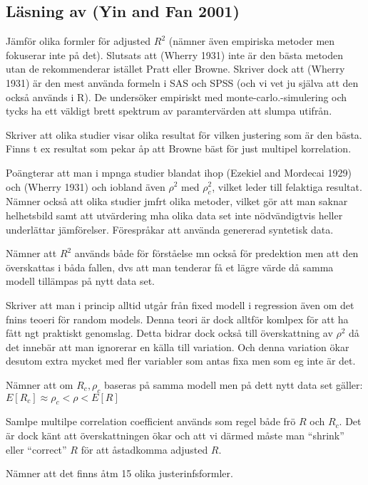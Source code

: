 \documentclass[]{article}
\begin{document}
\subsection{Läsning av (Yin and Fan 2001)}\label{lasning-av-yin2001}

Jämför olika formler för adjusted \(R^2\) (nämner även empiriska metoder
men fokuserar inte på det). Slutsats att (Wherry 1931) inte är den bästa
metoden utan de rekommenderar istället Pratt eller Browne. Skriver dock
att (Wherry 1931) är den mest använda formeln i SAS och SPSS (och vi vet
ju själva att den också används i R). De undersöker empiriskt med
monte-carlo.-simulering och tycks ha ett väldigt brett spektrum av
paramtervärden att slumpa utifrån.

Skriver att olika studier visar olika resultat för vilken justering som
är den bästa. Finns t ex resultat som pekar åp att Browne bäst för just
multipel korrelation.

Poängterar att man i mpnga studier blandat ihop (Ezekiel and Mordecai
1929) och (Wherry 1931) och iobland även \(\rho^2\) med \(\rho^2_c\),
vilket leder till felaktiga resultat. Nämner också att olika studier
jmfrt olika metoder, vilket gör att man saknar helhetsbild samt att
utvärdering mha olika data set inte nödvändigtvis heller underlättar
jämförelser. Förespråkar att använda genererad syntetisk data.

Nämner att \(R^2\) används både för förståelse mn också för predektion
men att den överskattas i båda fallen, dvs att man tenderar få et lägre
värde då samma modell tillämpas på nytt data set.

Skriver att man i princip alltid utgår från fixed modell i regression
även om det fnins teoeri för random models. Denna teori är dock alltför
komlpex för att ha fått ngt praktiskt genomslag. Detta bidrar dock också
till överskattning av \(\rho^2\) då det innebär att man ignorerar en
källa till variation. Och denna variation ökar desutom extra mycket med
fler variabler som antas fixa men som eg inte är det.

Nämner att om \(R_c, \rho_c\) baseras på samma modell men på dett nytt
data set gäller: \(E[R_c] \approx \rho_c < \rho < E[R]\)

Samlpe multilpe correlation coefficient används som regel både frö \(R\)
och \(R_c\). Det är dock känt att överskattningen ökar och att vi därmed
måste man ``shrink'' eller ``correct'' \(R\) för att åstadkomma adjusted
\(R\).

Nämner att det finns åtm 15 olika justerinfsformler.
\end{document}
